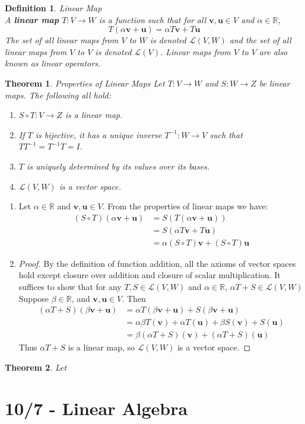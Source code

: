 \documentclass[12pt]{article}
\newtheorem{thm}{Theorem}[section] %
\theoremstyle{plain}
\newtheorem{definition}{Definition}[section]
\newcommand{\R}{\mathbb{R}}
\newcommand{\vv}{\mathbf{v}}
\newcommand{\vu}{\mathbf{u}}
\newcommand{\Lagr}{\mathcal{L}}
\begin{document}
    \begin{definition}{Linear Map}
        ~\\A \textbf{linear map} $T:V \to W$ is a function such that for all $\vv, \vu \in V$ and $\alpha \in \R$, $$T(\alpha \vv + \vu) = \alpha T \vv + T \vu$$
        The set of all linear maps from $V$ to $W$ is denoted $\Lagr(V, W)$ and the set of all linear maps from $V$ to $V$ is denoted $\Lagr(V)$. Linear maps from $V$ to $V$ are also known as linear operators.
    \end{definition}

    \begin{thm}{Properties of Linear Maps}
        Let $T:V \to W$ and $S:W \to Z$ be linear maps. The following all hold:
        \begin{enumerate}
            \item $S \circ T:V \to Z$ is a linear map.
            \item If $T$ is bijective, it has a unique inverse $T^{-1}:W \to V$ such that $TT^{-1} = T^{-1}T = I$.
            \item $T$ is uniquely determined by its values over its bases.
            \item $\Lagr(V, W)$ is a vector space.
        \end{enumerate}
    \end{thm}

    \begin{enumerate}
        \item Let $\alpha \in \R$ and $\vv, \vu \in V$. From the properties of linear maps we have:
        \begin{align}
            (S \circ T)(\alpha \vv + \vu) &= S(T(\alpha \vv + \vu))\\
            &= S(\alpha T \vv + T \vu)\\
            &= \alpha (S \circ T) \vv + (S \circ T) \vu
        \end{align}
        \item \begin{proof}
            By the definition of function addition, all the axioms of vector spaces hold except closure over addition and closure of scalar multiplication. It suffices to show that for any $T, S \in \Lagr(V, W)$ and $\alpha \in \R$, $\alpha T + S \in \Lagr(V,W)$
            Suppose $\beta \in \R$, and $\vv, \vu \in V$. Then 
            \begin{align}
                (\alpha T + S)(\beta \vv + \vu) &= \alpha T(\beta \vv + \vu) + S(\beta \vv + \vu)\\
                &= \alpha \beta T(\vv) + \alpha T(\vu) + \beta S(\vv) + S(\vu)\\
                &= \beta (\alpha T + S)(\vv) + (\alpha T + S)(\vu)
            \end{align}
            Thus $\alpha T + S$ is a linear map, so $\Lagr(V,W)$ is a vector space.
        \end{proof}
    \end{enumerate}
    

    \begin{thm}{}
        Let
    \end{thm}

    \section[d3]{10/7 - Linear Algebra}
\end{document}
